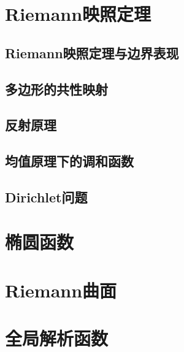 \documentclass[UTF8]{ctexart}
\begin{document}
\section{Riemann映照定理}
    
    \subsection{Riemann映照定理与边界表现}
    
    \subsection{多边形的共性映射}
    
    \subsection{反射原理}
    
    \subsection{均值原理下的调和函数}
    
    \subsection{Dirichlet问题}

\section{椭圆函数}

\section{Riemann曲面}

\section{全局解析函数}
\end{document}
